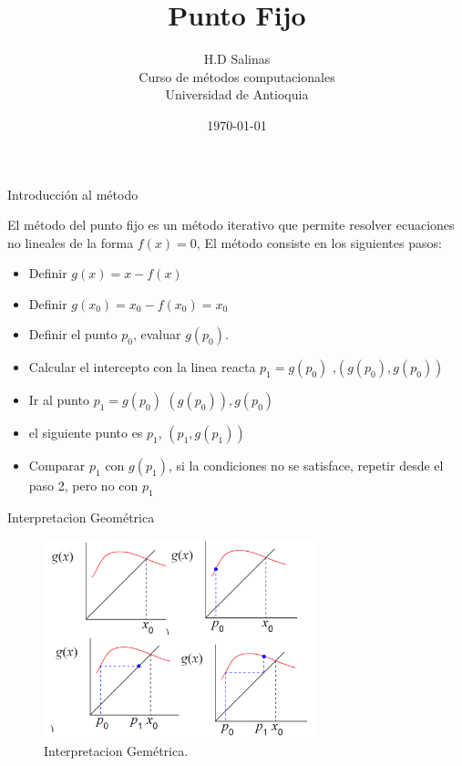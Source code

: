 \documentclass{beamer}
\title{Punto Fijo}
\author{H.D Salinas \\
Curso de métodos computacionales\\
Universidad de Antioquia\\}
\date{\today}
\begin{document}
\begin{frame}
  \titlepage
\end{frame}

\begin{frame}{Introducción al método}

El método del punto fijo es un método iterativo que permite resolver ecuaciones no lineales de la forma $f(x)=0$, 
El método consiste en los siguientes pasos:
\begin{itemize}
    \item Definir $g(x)=x-f(x)$
    \item Definir $g(x_0)=x_0-f(x_0)=x_0$
    \item Definir el punto $p_0$, evaluar $g(p_0)$.
    \item Calcular el intercepto con la linea reacta $p_1=g(p_0)$  ,$(g(p_0), g(p_0))$


    \item Ir al punto $p_1=g(p_0)$
    $(g(p_0)),g(p_0)$

    \item el siguiente punto es $p_1$, $(p_1, g(p_1))$
    \item Comparar $p_1$ con $g(p_1)$, si la condiciones no se satisface, repetir desde el paso 2, pero no con $p_1$
\end{itemize}



\end{frame}



\begin{frame}{Interpretacion Geométrica}

\begin{figure} 
\includegraphics[width=0.7\textwidth]{puntoFijo.png} \caption{Interpretacion Gemétrica.} \end{figure} 
\end{frame}
\end{document}
